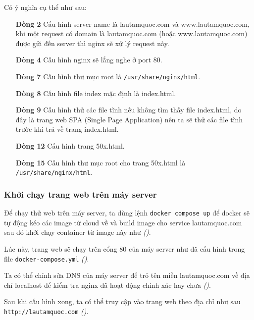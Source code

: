 \begin{itemize}[label={--}]
        Có ý nghĩa cụ thể như sau:
        \begin{itemize}
          \item[\bfseries Dòng 2] Cấu hình server name là lautamquoc.com và www.lautamquoc.com, khi một request có domain là lautamquoc.com (hoặc www.lautamquoc.com) được gửi đến server thì nginx sẽ xử lý request này.
          \item[\bfseries Dòng 4] Cấu hình nginx sẽ lắng nghe ở port 80.
          \item[\bfseries Dòng 7] Cấu hình thư mục root là \texttt{/usr/share/nginx/html}.
          \item[\bfseries Dòng 8] Cấu hình file index mặc định là index.html.
          \item[\bfseries Dòng 9] Cấu hình thử các file tĩnh nếu không tìm thấy file index.html, do đây là trang web SPA (Single Page Application) nên ta sẽ thử các file tĩnh trước khi trả về trang index.html.
          \item[\bfseries Dòng 12] Cấu hình trang 50x.html.
          \item[\bfseries Dòng 15] Cấu hình thư mục root cho trang 50x.html là \texttt{/usr/share/nginx/html}.
        \end{itemize}
\end{itemize}


\subsubsection{Khởi chạy trang web trên máy server}

Để chạy thử web trên máy server, ta dùng lệnh
\texttt{docker compose up} để docker sẽ tự động kéo
các image từ cloud về và build image cho service lautamquoc.com
sau đó khởi chạy container từ
image này như \textit{()}.


Lúc này, trang web sẽ chạy trên cổng 80 của máy server như đã cấu
hình trong file \texttt{docker-compose.yml} \textit{()}.


Ta có thể chỉnh sửa DNS của máy server để trỏ tên
miền lautamquoc.com về địa chỉ localhost để kiểm tra nginx đã hoạt
động chính xác hay chưa \textit{()}.


Sau khi cấu hình xong, ta có thể truy cập vào
trang web theo địa chỉ như sau \texttt{http://lautamquoc.com} \textit{()}.

